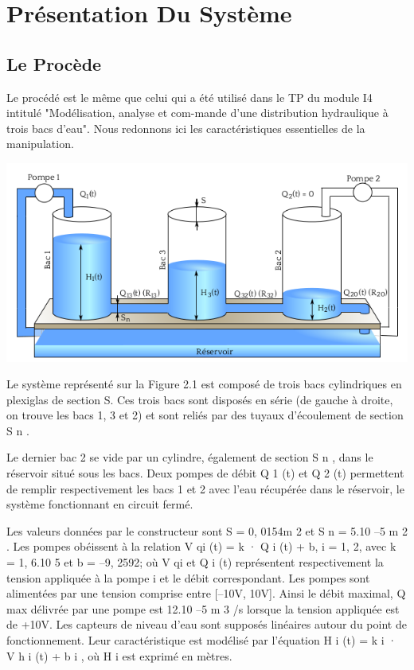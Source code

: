 \chapter{Présentation  Du Système }

 \section{Le Procède}

      Le procédé est le même que celui qui a été utilisé dans le TP du module I4 intitulé "Modélisation, analyse et com-mande d’une distribution hydraulique à trois bacs d’eau". Nous redonnons ici les caractéristiques essentielles de la manipulation.
      
\begin{center}
\includegraphics[scale=0.5]{fig1.png}
\label{fig1} 
\end{center}

      Le système représenté sur la Figure 2.1 est composé de trois bacs cylindriques en plexiglas de section S. Ces trois bacs sont disposés en série (de gauche à droite, on trouve les bacs 1, 3 et 2) et sont reliés par des tuyaux d’écoulement de section S n .
      
      Le dernier bac 2 se vide par un cylindre, également de section S n , dans le réservoir situé sous les bacs. Deux pompes de débit Q 1 (t) et Q 2 (t) permettent de remplir respectivement les bacs 1 et 2 avec l’eau récupérée dans le réservoir, le système fonctionnant en circuit fermé.

      Les valeurs données par le constructeur sont S = 0, 0154m 2 et S n = 5.10 –5 m 2 .
      Les pompes obéissent à la relation V qi (t) = k · Q i (t) + b, i = 1, 2, avec k = 1, 6.10 5 et b = –9, 2592; où V qi et Q i (t) représentent respectivement la tension appliquée à la pompe i et le débit correspondant.
      Les pompes sont alimentées par une tension comprise entre [–10V, 10V]. Ainsi le débit maximal, Q max
délivrée par une pompe est 12.10 –5 m 3 /s lorsque la tension appliquée est de +10V. Les capteurs de niveau d’eau sont supposés linéaires autour du point de fonctionnement. Leur caractéristique est modélisé par l’équation H i (t) = k i · V h i (t) + b i , où H i est exprimé en mètres.


